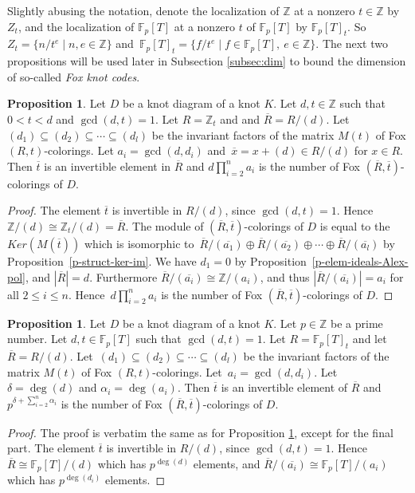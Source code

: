 \documentclass[11pt,a4paper]{article}
\theoremstyle{definition}
\newtheorem{proposition}[theorem]{Proposition}
\newcommand{\numberset}{\mathbb}
\newcommand{\F}{\numberset{F}}
\newcommand{\Z}{\numberset{Z}}
\begin{document}
Slightly abusing the notation, denote the localization of $\Z$ at a nonzero $t\in \Z$ by $Z_t$, and the localization of $\F_p[T]$ at a nonzero $t$ of $\F_p[T]$ by $\F_p[T]_t$. So $Z_t=\{ n/t^e \mid n,e \in\Z \}$ and~$\F_p[T]_t=\{ f/t^e \mid f\in \F_p[T],\ e \in\Z \}$. The next two propositions will be used later in Subsection \ref{subsec:dim} to bound the dimension of so-called \textit{Fox knot codes}. 


\begin{proposition}\label{p-number-color-Z}
Let $D$ be a  knot diagram of a knot $K$.
Let $d, t\in \Z$ such that $0<t<d$ and $ \gcd(d,t)=1$. Let $R=\Z_t$ and and $\overline{R}=R/(d)$.
Let  $(d_1)\subseteq (d_2)\subseteq \cdots \subseteq (d_l) $ be the invariant factors of the matrix $M(t)$ of Fox $(R,t)$-colorings.
Let $a_i=\gcd (d,d_i)$ and~$\overline{x}=x+(d) \in R/(d)$ for $x\in R$.
Then $\overline{t}$ is an invertible element in $\overline{R}$ and $d\prod_{i=2}^n a_i$ is the number of Fox $(\overline{R},\overline{t})$-colorings of $D$.
\end{proposition}
\begin{proof}


The element $\overline{t}$ is invertible in $R/(d)$, since $ \gcd(d,t)=1$. 
Hence~$\Z/(d)\cong \Z_t/(d)=\overline{R}$.
The module of $(\overline{R},\overline{t})$-colorings of $D$ is equal to the $Ker(M(\overline{t}) )$ which is isomorphic to~$ \overline{R}/(\overline{a_1}) \oplus \overline{R}/(\overline{a_2}) \oplus  \cdots \oplus  \overline{R}/(\overline{a_l})$ by Proposition~\ref{p-struct-ker-im}. We have $d_1=0$ by Proposition~\ref{p-elem-ideals-Alex-pol}, and $|\overline{R}|=d$. Furthermore $\overline{R}/(\overline{a_i})\cong \Z/(a_i)$, and thus $|\overline{R}/(\overline{a_i})|=a_i$ for all $2 \leq i\leq n$.
Hence~$d\prod_{i=2}^n a_i$ is the number of Fox $(\overline{R},\overline{t})$-colorings of $D$.
\end{proof}


\begin{proposition}\label{p-number-color-prime}
Let $D$ be a  knot diagram of a knot $K$.
Let $p\in \Z$  be a prime number. Let $d,t \in \F_p[T]$ such that $\gcd(d,t)=1$. Let $R=\F_p[T]_t$ and let $\overline{R}=R/(d)$.
Let~$(d_1)\subseteq (d_2)\subseteq \cdots \subseteq (d_l) $ be the invariant factors of the matrix $M(t)$ of Fox $(R,t)$-colorings.
Let~$a_i=\gcd (d,d_i)$. Let $\delta = \deg (d)$ and $\alpha_i = \deg (a_i)$.
Then $\overline{t}$ is an invertible element of $\overline{R}$ and~$p^{\delta+\sum_{i=2}^n \alpha_i}$ is the number of Fox $(\overline{R},\overline{t})$-colorings of $D$.
\end{proposition}
\begin{proof}
The proof is verbatim the same as for Proposition \ref{p-number-color-Z}, except for the final part. The element $\overline{t}$ is invertible in $R/(d)$, since $ \gcd(d,t)=1$. 
Hence $\overline{R}\cong \F_p[T]/(d)$ which has $p^{\deg(d)}$ elements, and 
$\overline{R}/(\overline{a_i})\cong \F_p[T]/(a_i)$ which has $p^{\deg(d_i)}$ elements.
\end{proof}
\end{document}
